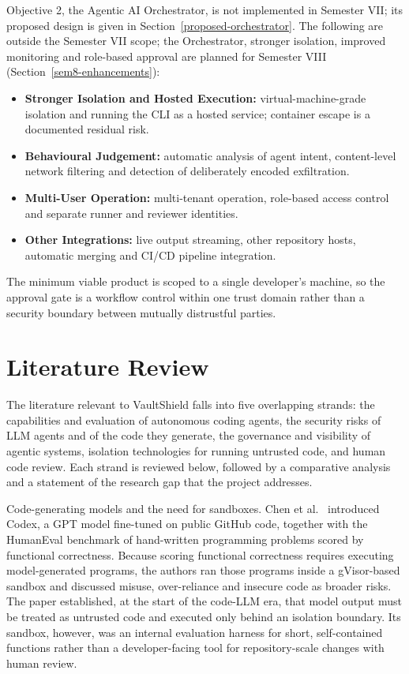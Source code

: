 \documentclass[12pt,a4paper,oneside]{report}
\providecommand{\tightlist}{\setlength{\itemsep}{0pt}\setlength{\parskip}{0pt}}
\begin{document}
Objective 2, the Agentic AI Orchestrator, is not implemented in Semester VII; its proposed design is given in Section~\ref{proposed-orchestrator}. The following are outside the Semester VII scope; the Orchestrator, stronger isolation, improved monitoring and role-based approval are planned for Semester VIII (Section~\ref{sem8-enhancements}):

\begin{itemize}
\tightlist
\item
  \textbf{Stronger Isolation and Hosted Execution:} virtual-machine-grade isolation and running the CLI as a hosted service; container escape is a documented residual risk.
\item
  \textbf{Behavioural Judgement:} automatic analysis of agent intent, content-level network filtering and detection of deliberately encoded exfiltration.
\item
  \textbf{Multi-User Operation:} multi-tenant operation, role-based access control and separate runner and reviewer identities.
\item
  \textbf{Other Integrations:} live output streaming, other repository hosts, automatic merging and CI/CD pipeline integration.
\end{itemize}

The minimum viable product is scoped to a single developer's machine, so the approval gate is a workflow control within one trust domain rather than a security boundary between mutually distrustful parties.

\clearpage

\chapter{Literature Review}\label{literature-review}

The literature relevant to VaultShield falls into five overlapping strands: the capabilities and evaluation of autonomous coding agents, the security risks of LLM agents and of the code they generate, the governance and visibility of agentic systems, isolation technologies for running untrusted code, and human code review. Each strand is reviewed below, followed by a comparative analysis and a statement of the research gap that the project addresses.

Code-generating models and the need for sandboxes. Chen et al.~\cite{ref1} introduced Codex, a GPT model fine-tuned on public GitHub code, together with the HumanEval benchmark of hand-written programming problems scored by functional correctness. Because scoring functional correctness requires executing model-generated programs, the authors ran those programs inside a gVisor-based sandbox and discussed misuse, over-reliance and insecure code as broader risks. The paper established, at the start of the code-LLM era, that model output must be treated as untrusted code and executed only behind an isolation boundary. Its sandbox, however, was an internal evaluation harness for short, self-contained functions rather than a developer-facing tool for repository-scale changes with human review.
\end{document}
